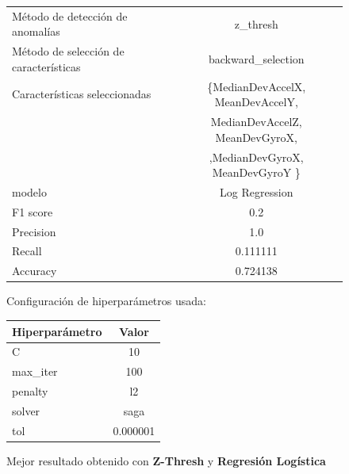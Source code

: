\begin{appendices}
		\begin{figure}[htb]
			\centering
			\caption{Mejor resultado obtenido con \textbf{Z-Thresh} y \textbf{Regresión Logística}}
			\label{table:29}
			\begin{tabular}{lc}
				\toprule
				\midrule
					  Método de detección de anomalías &                                           z\_thresh \\
				Método de selección de características &                                 backward\_selection \\
						 Características seleccionadas & \{MedianDevAccelX, MeanDevAccelY, \\ 
						                               &  MedianDevAccelZ, MeanDevGyroX, \\
						 							   &    ,MedianDevGyroX, MeanDevGyroY \}\\		
												modelo &                                     Log Regression \\
											  F1 score &                                                0.2 \\
											 Precision &                                                1.0 \\
												Recall &                                           0.111111 \\
											  Accuracy &                                           0.724138 \\
				\bottomrule
			\end{tabular}
			\newline
			\newline
			Configuración de hiperparámetros usada:
			\begin{tabular}{lc}
				\toprule
				Hiperparámetro &     Valor \\
				\midrule
							 C &        10 \\
					  max\_iter &       100 \\
					   penalty &        l2 \\
						solver &      saga \\
						   tol &  0.000001 \\
				\bottomrule
			\end{tabular}
			
		\end{figure}


\end{appendices}
